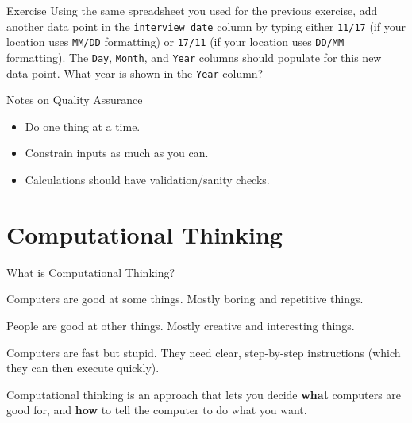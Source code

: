 \documentclass[aspectratio=1610, 11pt]{beamer} %
\begin{document}
\begin{frame}{Exercise}
Using the same spreadsheet you used for the previous exercise, add another data point in the {\tt interview\_date} column by typing either {\tt 11/17} (if your location uses {\tt MM/DD} formatting) or {\tt 17/11} (if your location uses {\tt DD/MM} formatting). The {\tt Day}, {\tt Month}, and {\tt Year} columns should populate for this new data point. What year is shown in the {\tt Year} column?
\end{frame}

\begin{frame}{Notes on Quality Assurance}

\begin{itemize}[label=\textbullet]
    \item Do one thing at a time.
    \item Constrain inputs as much as you can.
    \item Calculations should have validation/sanity checks.
\end{itemize}
\end{frame}

\section{Computational Thinking}

\begin{frame}{What is Computational Thinking?}

Computers are good at some things. Mostly boring and repetitive things. 

People are good at other things. Mostly creative and interesting things.

Computers are fast but stupid. They need clear, step-by-step instructions (which they can then execute quickly).

Computational thinking is an approach that lets you decide \textbf{what} computers are good for, and \textbf{how} to tell the computer to do what you want.

\end{frame}
\end{document}
